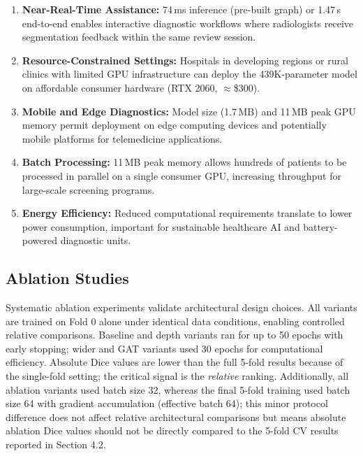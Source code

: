 \begin{enumerate}
    \item \textbf{Near-Real-Time Assistance:} 74\,ms inference (pre-built graph) or 1.47\,s end-to-end enables interactive diagnostic workflows where radiologists receive segmentation feedback within the same review session.

    \item \textbf{Resource-Constrained Settings:} Hospitals in developing regions or rural clinics with limited GPU infrastructure can deploy the 439K-parameter model on affordable consumer hardware (RTX 2060, $\approx$\$300).

    \item \textbf{Mobile and Edge Diagnostics:} Model size (1.7\,MB) and 11\,MB peak GPU memory permit deployment on edge computing devices and potentially mobile platforms for telemedicine applications.

    \item \textbf{Batch Processing:} 11\,MB peak memory allows hundreds of patients to be processed in parallel on a single consumer GPU, increasing throughput for large-scale screening programs.

    \item \textbf{Energy Efficiency:} Reduced computational requirements translate to lower power consumption, important for sustainable healthcare AI and battery-powered diagnostic units.
\end{enumerate}


\subsection{Ablation Studies}

Systematic ablation experiments validate architectural design choices. All variants are trained on Fold 0 alone under identical data conditions, enabling controlled relative comparisons. Baseline and depth variants ran for up to 50 epochs with early stopping; wider and GAT variants used 30 epochs for computational efficiency. Absolute Dice values are lower than the full 5-fold results because of the single-fold setting; the critical signal is the \textit{relative} ranking. Additionally, all ablation variants used batch size 32, whereas the final 5-fold training used batch size 64 with gradient accumulation (effective batch 64); this minor protocol difference does not affect relative architectural comparisons but means absolute ablation Dice values should not be directly compared to the 5-fold CV results reported in Section 4.2.

